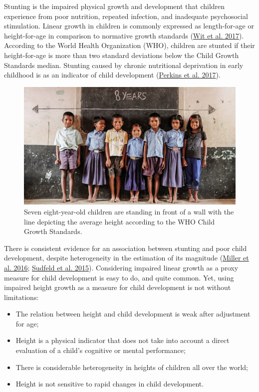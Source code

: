 \documentclass[
]{book}
\begin{document}
Stunting is the impaired physical growth and development that children experience from poor nutrition, repeated infection, and inadequate psychosocial stimulation. Linear growth in children is commonly expressed as length-for-age or height-for-age in comparison to normative growth standards (\protect\hyperlink{ref-wit2017practical}{Wit et al. 2017}). According to the World Health Organization (WHO), children are stunted if their height-for-age is more than two standard deviations below the Child Growth Standards median. Stunting caused by chronic nutritional deprivation in early childhood is as an indicator of child development (\protect\hyperlink{ref-perkins2017understanding}{Perkins et al. 2017}).

\begin{figure}

{\centering \includegraphics[width=1\linewidth]{fig/stuntedchildren} 

}

\caption{Seven eight-year-old children are standing in front of a wall with the line depicting the average height according to the WHO Child Growth Standards.}\label{fig:shortkids}
\end{figure}



There is consistent evidence for an association between stunting and poor child development, despite heterogeneity in the estimation of its magnitude (\protect\hyperlink{ref-miller2016consistent}{Miller et al. 2016}; \protect\hyperlink{ref-sudfeld2015linear}{Sudfeld et al. 2015}). Considering impaired linear growth as a proxy measure for child development is easy to do, and quite common. Yet, using impaired height growth as a measure for child development is not without limitations:

\begin{itemize}
\item
  The relation between height and child development is weak after adjustment for age;
\item
  Height is a physical indicator that does not take into account a direct evaluation of a child's cognitive or mental performance;
\item
  There is considerable heterogeneity in heights of children all over the world;
\item
  Height is not sensitive to rapid changes in child development.
\end{itemize}
\end{document}
